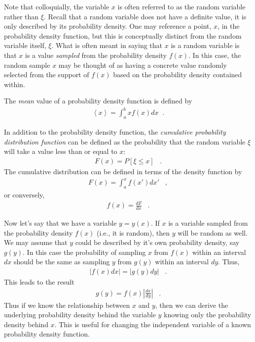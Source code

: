 \documentclass[11pt]{article}
\begin{document}
Note that colloquially, the variable \(x\) is often referred to as the random variable rather than \(\xi\).  Recall that a random variable does not have a definite value, it is only described by its probability density.  One may reference a point, \(x\), in the probability density function, but this is conceptually distinct from the random variable itself, \(\xi\).  What is often meant in saying that \(x\) is a random variable is that \(x\) is a value \emph{sampled} from the probability density \(f(x)\).  In this case, the random sample \(x\) may be thought of as having a concrete value randomly selected from the support of \(f(x)\) based on the probability density contained within.

The \emph{mean} value of a probability density function is defined by
\begin{align}
  \left< x \right> = \int_a^b x f(x) dx \;\;.
\end{align}

In addition to the probability density function, the \emph{cumulative probability distribution function} can be defined as the probability that the random variable \(\xi\) will take a value less than or equal to \(x\):
\begin{align}
  F(x) = P\left[ \xi \leq x \right] \;\;\; .
\end{align}
The cumulative distribution can be defined in terms of the density function by
\begin{align}
  F(x) = \int_a^x f(x') dx' \;\;\; ,
\end{align}
or conversely,
\begin{align}
  f(x) = \frac{dF}{dx} \;\;\;.
\end{align}

Now let's say that we have a variable \(y = y(x)\).  If \(x\) is a variable sampled from the probability density \(f(x)\) (i.e., it is random), then \(y\) will be random as well.  We may assume that \(y\) could be described by it's own probability density, say \(g(y)\).  In this case the probability of sampling \(x\) from \(f(x)\) within an interval \(dx\) should be the same as sampling \(y\) from \(g(y)\) within an interval \(dy\).  Thus,
\begin{align}
  \left| f(x) dx \right| = \left| g(y) dy \right| \;\;\;.
\end{align}
This leads to the result
\begin{align}
  g(y) = f(x) \left| \frac{dx}{dy} \right| \;\;\;.
\end{align}
Thus if we know the relationship between \(x\) and \(y\), then we can derive the underlying probability density behind the variable \(y\) knowing only the probability density behind \(x\).  This is useful for changing the independent variable of a known probability density function.
\end{document}
